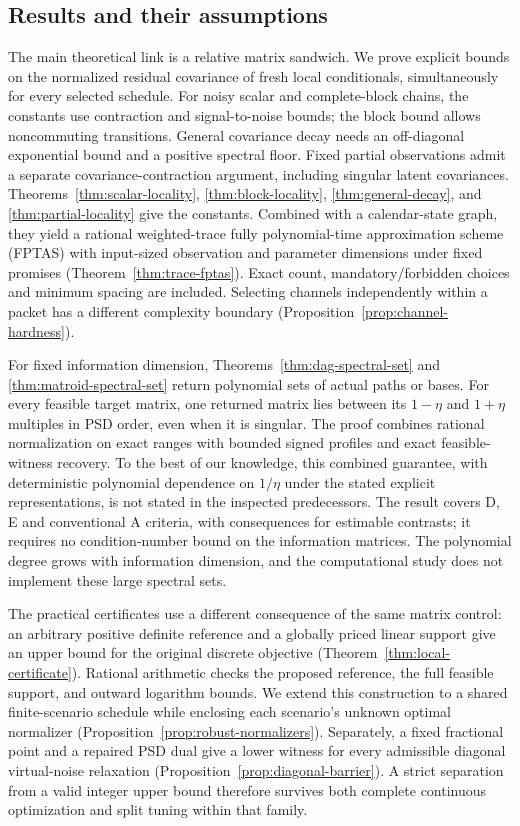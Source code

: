 \subsection{Results and their assumptions}\label{subsec:intro-results}

The main theoretical link is a relative matrix sandwich. We prove explicit
bounds on the normalized residual covariance of fresh local conditionals,
simultaneously for every selected schedule. For noisy scalar and complete-block
chains, the constants use contraction and signal-to-noise bounds; the block
bound allows noncommuting transitions. General covariance decay needs an
off-diagonal exponential bound and a positive spectral floor. Fixed partial
observations admit a separate covariance-contraction argument, including
singular latent covariances. Theorems~\ref{thm:scalar-locality},
\ref{thm:block-locality}, \ref{thm:general-decay}, and
\ref{thm:partial-locality} give the constants. Combined with a calendar-state
graph, they yield a rational weighted-trace fully polynomial-time approximation
scheme (FPTAS) with input-sized observation
and parameter dimensions under fixed promises
(Theorem~\ref{thm:trace-fptas}). Exact count, mandatory/forbidden choices and
minimum spacing are included. Selecting channels independently within a
packet has a different complexity boundary
(Proposition~\ref{prop:channel-hardness}).

For fixed information dimension, Theorems~\ref{thm:dag-spectral-set} and
\ref{thm:matroid-spectral-set} return polynomial sets of actual paths or bases.
For every feasible target matrix, one returned matrix lies between its
$1-\eta$ and $1+\eta$ multiples in PSD order, even when it is singular.
The proof combines rational normalization on exact ranges with bounded signed
profiles and exact feasible-witness recovery. To the best of our knowledge,
this combined guarantee, with deterministic polynomial dependence on
$1/\eta$ under the stated explicit representations, is not stated in the
inspected predecessors. The result covers D, E and conventional A criteria, with consequences
for estimable contrasts; it requires no condition-number bound on the
information matrices. The polynomial degree grows with information dimension,
and the computational study does not implement these large spectral sets.

The practical certificates use a different consequence of the same matrix
control: an arbitrary positive definite reference and a globally priced
linear support give an upper bound for the original discrete objective
(Theorem~\ref{thm:local-certificate}). Rational arithmetic checks the proposed
reference, the full feasible support, and outward logarithm bounds. We extend
this construction to a shared finite-scenario schedule while enclosing each
scenario's unknown optimal normalizer
(Proposition~\ref{prop:robust-normalizers}). Separately, a fixed fractional
point and a repaired PSD dual give a lower witness for every admissible
diagonal virtual-noise relaxation (Proposition~\ref{prop:diagonal-barrier}).
A strict separation from a valid integer upper bound therefore survives both
complete continuous optimization and split tuning within that family.

